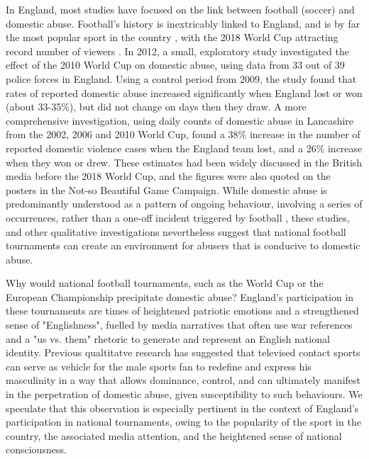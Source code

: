\documentclass[12pt, letterpaper]{article}
\begin{document}
In England, most studies have focused on the link between football (soccer) and domestic abuse. Football's history is inextricably linked to England, and is by far the most popular sport in the country \autocite{Parry2014}, with the 2018 World Cup attracting record number of viewers \autocite{BBC}. In 2012, a small, exploratory study investigated the effect of the 2010 World Cup on domestic abuse, using data from 33 out of 39 police forces in England\autocite{Brimicombe2012}. Using a control period from 2009, the study found that rates of reported domestic abuse increased significantly when England lost or won (about 33-35\%), but did not change on days then they draw. A more comprehensive investigation, using daily counts of domestic abuse in Lancashire from the 2002, 2006 and 2010 World Cup, found a 38\% increase in the number of reported domestic violence cases when the England team lost, and a 26\% increase when they won or drew\autocite{Kirby2014}. These estimates had been widely discussed in the British media before the 2018 World Cup, and the figures were also quoted on the posters in the Not-so Beautiful Game Campaign. While domestic abuse is predominantly understood as a pattern of ongoing behaviour, involving a series of occurrences, rather than a one-off incident triggered by football \autocite{Brooks-Hay2018}, these studies, and other qualitative investigations\autocite{Swallow} nevertheless suggest that national football tournaments can create an environment for abusers that is conducive to domestic abuse.

Why would national football tournaments, such as the World Cup or the European Championship precipitate domestic abuse? England's participation in these tournaments are times of heightened patriotic emotions and a strengthened sense of "Englishness", fuelled by media narratives that often use war references and a "us vs. them" rhetoric to generate and represent an English national identity\autocite{Vincent2014}.  Previous qualtitatve research has suggested that televised contact sports can serve as vehicle for the male sports fan to redefine and express his masculinity in a way that allows dominance, control, and can ultimately manifest in the perpetration of domestic abuse, given susceptibility to such behaviours\autocite{Sabo,Swallow}. We speculate that this observation is especially pertinent in the context of England's participation in national tournaments, owing to the popularity of the sport in the country, the associated media attention, and the heightened sense of national consciousness.
\end{document}
